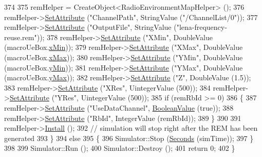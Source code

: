 \begin{DoxyCode}
374 
375       remHelper = CreateObject<RadioEnvironmentMapHelper> ();
376       remHelper->\hyperlink{classns3_1_1ObjectBase_ac60245d3ea4123bbc9b1d391f1f6592f}{SetAttribute} (\textcolor{stringliteral}{"ChannelPath"}, StringValue (\textcolor{stringliteral}{"/ChannelList/0"}));
377       remHelper->\hyperlink{classns3_1_1ObjectBase_ac60245d3ea4123bbc9b1d391f1f6592f}{SetAttribute} (\textcolor{stringliteral}{"OutputFile"}, StringValue (\textcolor{stringliteral}{"lena-frequency-reuse.rem"}));
378       remHelper->\hyperlink{classns3_1_1ObjectBase_ac60245d3ea4123bbc9b1d391f1f6592f}{SetAttribute} (\textcolor{stringliteral}{"XMin"}, DoubleValue (macroUeBox.\hyperlink{classns3_1_1Box_a1fd6a43d53258323331d34da600ff1c5}{xMin}));
379       remHelper->\hyperlink{classns3_1_1ObjectBase_ac60245d3ea4123bbc9b1d391f1f6592f}{SetAttribute} (\textcolor{stringliteral}{"XMax"}, DoubleValue (macroUeBox.\hyperlink{classns3_1_1Box_a50021049c756e770329145b25d9533a2}{xMax}));
380       remHelper->\hyperlink{classns3_1_1ObjectBase_ac60245d3ea4123bbc9b1d391f1f6592f}{SetAttribute} (\textcolor{stringliteral}{"YMin"}, DoubleValue (macroUeBox.\hyperlink{classns3_1_1Box_a3865ed092f941186823539c9979002f8}{yMin}));
381       remHelper->\hyperlink{classns3_1_1ObjectBase_ac60245d3ea4123bbc9b1d391f1f6592f}{SetAttribute} (\textcolor{stringliteral}{"YMax"}, DoubleValue (macroUeBox.\hyperlink{classns3_1_1Box_a001fd430a14b19efe925c818a332e392}{yMax}));
382       remHelper->\hyperlink{classns3_1_1ObjectBase_ac60245d3ea4123bbc9b1d391f1f6592f}{SetAttribute} (\textcolor{stringliteral}{"Z"}, DoubleValue (1.5));
383       remHelper->\hyperlink{classns3_1_1ObjectBase_ac60245d3ea4123bbc9b1d391f1f6592f}{SetAttribute} (\textcolor{stringliteral}{"XRes"}, UintegerValue (500));
384       remHelper->\hyperlink{classns3_1_1ObjectBase_ac60245d3ea4123bbc9b1d391f1f6592f}{SetAttribute} (\textcolor{stringliteral}{"YRes"}, UintegerValue (500));
385       \textcolor{keywordflow}{if} (remRbId >= 0)
386         \{
387           remHelper->\hyperlink{classns3_1_1ObjectBase_ac60245d3ea4123bbc9b1d391f1f6592f}{SetAttribute} (\textcolor{stringliteral}{"UseDataChannel"}, \hyperlink{classns3_1_1BooleanValue}{BooleanValue} (\textcolor{keyword}{true}));
388           remHelper->\hyperlink{classns3_1_1ObjectBase_ac60245d3ea4123bbc9b1d391f1f6592f}{SetAttribute} (\textcolor{stringliteral}{"RbId"}, IntegerValue (remRbId));
389         \}
390 
391       remHelper->\hyperlink{classns3_1_1RadioEnvironmentMapHelper_a0b15c982ea80037f9409d73654b48548}{Install} ();
392       \textcolor{comment}{// simulation will stop right after the REM has been generated}
393     \}
394   \textcolor{keywordflow}{else}
395     \{
396       Simulator::Stop (\hyperlink{group__timecivil_ga33c34b816f8ff6628e33d5c8e9713b9e}{Seconds} (simTime));
397     \}
398 
399   Simulator::Run ();
400   Simulator::Destroy ();
401   \textcolor{keywordflow}{return} 0;
402 \}
\end{DoxyCode}


